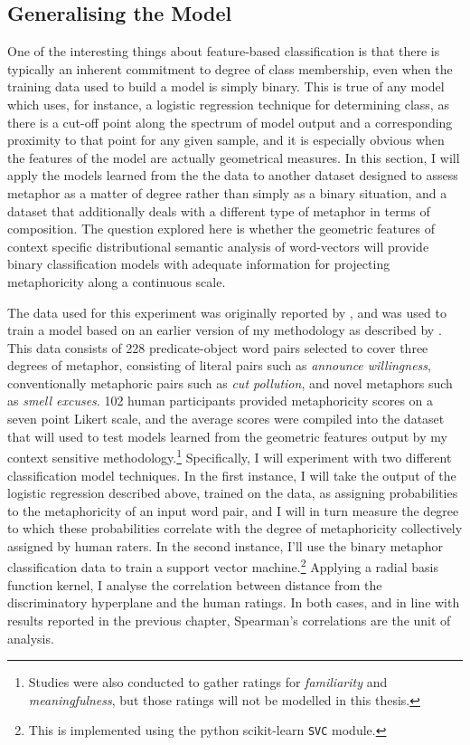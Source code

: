 \subsection{Generalising the Model} \label{sec:genaphor}
One of the interesting things about feature-based classification is that there is typically an inherent commitment to degree of class membership, even when the training data used to build a model is simply binary.  This is true of any model which uses, for instance, a logistic regression technique for determining class, as there is a cut-off point along the spectrum of model output and a corresponding proximity to that point for any given sample, and it is especially obvious when the features of the model are actually geometrical measures.  In this section, I will apply the models learned from the the \cite{GutierrezEA2016} data to another dataset designed to assess metaphor as a matter of degree rather than simply as a binary situation, and a dataset that additionally deals with a different type of metaphor in terms of composition.  The question explored here is whether the geometric features of context specific distributional semantic analysis of word-vectors will provide binary classification models with adequate information for projecting metaphoricity along a continuous scale.

The data used for this experiment was originally reported by \cite{JankowiakEA2015}, and was used to train a model based on an earlier version of my methodology as described by \cite{AgresEA2016}.  This data consists of 228 predicate-object word pairs selected to cover three degrees of metaphor, consisting of literal pairs such as \emph{announce willingness}, conventionally metaphoric pairs such as \emph{cut pollution}, and novel metaphors such as \emph{smell excuses}.  102 human participants provided metaphoricity scores on a seven point Likert scale, and the average scores were compiled into the dataset that will used to test models learned from the geometric features output by my context sensitive methodology.\footnote{Studies were also conducted to gather ratings for \emph{familiarity} and \emph{meaningfulness}, but those ratings will not be modelled in this thesis.}  Specifically, I will experiment with two different classification model techniques.  In the first instance, I will take the output of the logistic regression described above, trained on the \cite{GutierrezEA2016} data, as assigning probabilities to the metaphoricity of an input word pair, and I will in turn measure the degree to which these probabilities correlate with the degree of metaphoricity collectively assigned by human raters.  In the second instance, I'll use the binary metaphor classification data to train a support vector machine.\footnote{This is implemented using the python scikit-learn \texttt{SVC} module.}  Applying a radial basis function kernel, I analyse the correlation between distance from the discriminatory hyperplane and the human ratings.  In both cases, and in line with results reported in the previous chapter, Spearman's correlations are the unit of analysis.

